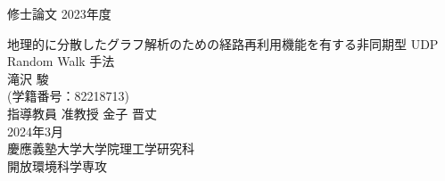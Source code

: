 \pagestyle{empty}

{\LARGE 修士論文} \hspace{\fill} {\LARGE 2023年度}
\begin{center}
  \vspace{5cm}
  {\huge 地理的に分散したグラフ解析のための経路再利用機能を有する非同期型 UDP Random Walk 手法}\\
  \vspace{2cm}
  {\Huge 滝沢 駿}\\
  {\LARGE (学籍番号：82218713)}\\
  \vspace{3cm}
  {\LARGE 指導教員 准教授 金子 晋丈}\\
  \vspace{2cm}
  {\Large 2024年3月}\\
  \vspace{1cm}
  {\LARGE 慶應義塾大学大学院理工学研究科}\\
  {\LARGE 開放環境科学専攻} \\
\end{center}

\clearpage
\newpage